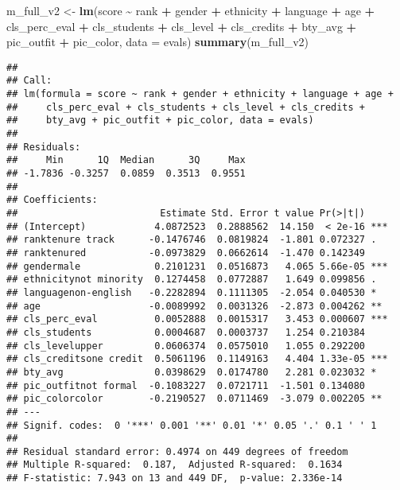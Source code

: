 \documentclass[
]{article}
\newenvironment{Shaded}{\begin{snugshade}}{\end{snugshade}}
\newcommand{\AttributeTok}[1]{\textcolor[rgb]{0.13,0.29,0.53}{#1}}
\newcommand{\FunctionTok}[1]{\textcolor[rgb]{0.13,0.29,0.53}{\textbf{#1}}}
\newcommand{\NormalTok}[1]{#1}
\newcommand{\OtherTok}[1]{\textcolor[rgb]{0.56,0.35,0.01}{#1}}
\newcommand{\SpecialCharTok}[1]{\textcolor[rgb]{0.81,0.36,0.00}{\textbf{#1}}}
\begin{document}
\begin{Shaded}
\begin{Highlighting}[]
\NormalTok{m\_full\_v2 }\OtherTok{\textless{}{-}} \FunctionTok{lm}\NormalTok{(score }\SpecialCharTok{\textasciitilde{}}\NormalTok{ rank }\SpecialCharTok{+}\NormalTok{ gender }\SpecialCharTok{+}\NormalTok{ ethnicity }\SpecialCharTok{+}\NormalTok{ language }\SpecialCharTok{+}\NormalTok{ age }\SpecialCharTok{+}\NormalTok{ cls\_perc\_eval }
             \SpecialCharTok{+}\NormalTok{ cls\_students }\SpecialCharTok{+}\NormalTok{ cls\_level }\SpecialCharTok{+}\NormalTok{ cls\_credits }\SpecialCharTok{+}\NormalTok{ bty\_avg }
             \SpecialCharTok{+}\NormalTok{ pic\_outfit }\SpecialCharTok{+}\NormalTok{ pic\_color, }\AttributeTok{data =}\NormalTok{ evals)}
\FunctionTok{summary}\NormalTok{(m\_full\_v2)}
\end{Highlighting}
\end{Shaded}

\begin{verbatim}
## 
## Call:
## lm(formula = score ~ rank + gender + ethnicity + language + age + 
##     cls_perc_eval + cls_students + cls_level + cls_credits + 
##     bty_avg + pic_outfit + pic_color, data = evals)
## 
## Residuals:
##     Min      1Q  Median      3Q     Max 
## -1.7836 -0.3257  0.0859  0.3513  0.9551 
## 
## Coefficients:
##                         Estimate Std. Error t value Pr(>|t|)    
## (Intercept)            4.0872523  0.2888562  14.150  < 2e-16 ***
## ranktenure track      -0.1476746  0.0819824  -1.801 0.072327 .  
## ranktenured           -0.0973829  0.0662614  -1.470 0.142349    
## gendermale             0.2101231  0.0516873   4.065 5.66e-05 ***
## ethnicitynot minority  0.1274458  0.0772887   1.649 0.099856 .  
## languagenon-english   -0.2282894  0.1111305  -2.054 0.040530 *  
## age                   -0.0089992  0.0031326  -2.873 0.004262 ** 
## cls_perc_eval          0.0052888  0.0015317   3.453 0.000607 ***
## cls_students           0.0004687  0.0003737   1.254 0.210384    
## cls_levelupper         0.0606374  0.0575010   1.055 0.292200    
## cls_creditsone credit  0.5061196  0.1149163   4.404 1.33e-05 ***
## bty_avg                0.0398629  0.0174780   2.281 0.023032 *  
## pic_outfitnot formal  -0.1083227  0.0721711  -1.501 0.134080    
## pic_colorcolor        -0.2190527  0.0711469  -3.079 0.002205 ** 
## ---
## Signif. codes:  0 '***' 0.001 '**' 0.01 '*' 0.05 '.' 0.1 ' ' 1
## 
## Residual standard error: 0.4974 on 449 degrees of freedom
## Multiple R-squared:  0.187,  Adjusted R-squared:  0.1634 
## F-statistic: 7.943 on 13 and 449 DF,  p-value: 2.336e-14
\end{verbatim}
\end{document}
